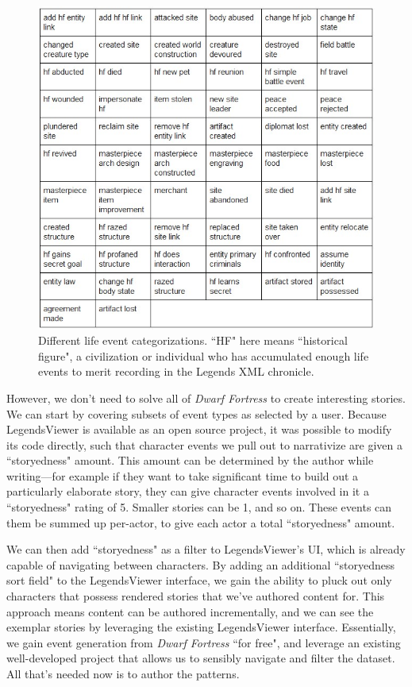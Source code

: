 \begin{figure}
    \centering
    \includegraphics[width=\textwidth]{figures/4-Delve/dwarf-fortress-event-types.jpg}
    \caption{Different life event categorizations. ``HF" here means ``historical figure", a civilization or individual who has accumulated enough life events to merit recording in the Legends XML chronicle.}
    \label{fig:DF-event-types}
\end{figure}


However, we don't need to solve all of \textit{Dwarf Fortress} to create interesting stories. We can start by covering subsets of event types as selected by a user.  Because LegendsViewer is available as an open source project, it was possible to modify its code directly, such that character events we pull out to narrativize are given a ``storyedness" amount. This amount can be determined by the author while writing---for example if they want to take significant time to build out a particularly elaborate story, they can give character events involved in it a ``storyedness" rating of 5. Smaller stories can be 1, and so on. These events can them be summed up per-actor, to give each actor a total ``storyedness" amount.

We can then add ``storyedness" as a filter to LegendsViewer's UI, which is already capable of navigating between characters. By adding an additional ``storyedness sort field" to the LegendsViewer interface, we gain the ability to pluck out only characters that possess rendered stories that we've authored content for. This approach means content can be authored incrementally, and we can see the exemplar stories by leveraging the existing LegendsViewer interface. Essentially, we gain event generation from \textit{Dwarf Fortress} ``for free", and leverage an existing well-developed project that allows us to sensibly navigate and filter the dataset. All that's needed now is to author the patterns.

